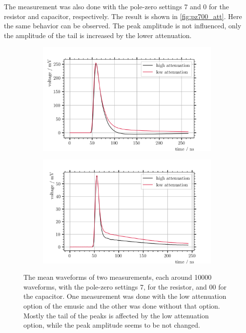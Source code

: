 The measurement was also done with the pole-zero settings 7 and 0 for the resistor and capacitor, respectively.
The result is shown in \autoref{fig:pz700_att}.
Here the same behavior can be observed.
The peak amplitude is not influenced, only the amplitude of the tail is increased by the lower attenuation.
\begin{figure}
	\centering
	\begin{subfigure}[b]{1.\textwidth}
		\centering
		\includegraphics[width=1.\textwidth]{pictures/att_pz331}
		\caption[]{}
		\label{fig:pz331_att}
	\end{subfigure}
	\begin{subfigure}[b]{1.\textwidth}
		\centering
		\includegraphics[width=1.\textwidth]{pictures/att_pz700}
		\caption[]{}
		\label{fig:pz700_att}
	\end{subfigure}
	\caption[todo]{The mean waveforms of two measurements, each around \num{10000} waveforms, with the pole-zero settings 7, for the resistor, and 00 for the capacitor. One measurement was done with the low attenuation option of the \ac{emusic} and the other was done without that option. Mostly the tail of the peaks is affected by the low attenuation option, while the peak amplitude seems to be not changed.}
	\label{fig:pz_att}
\end{figure}

